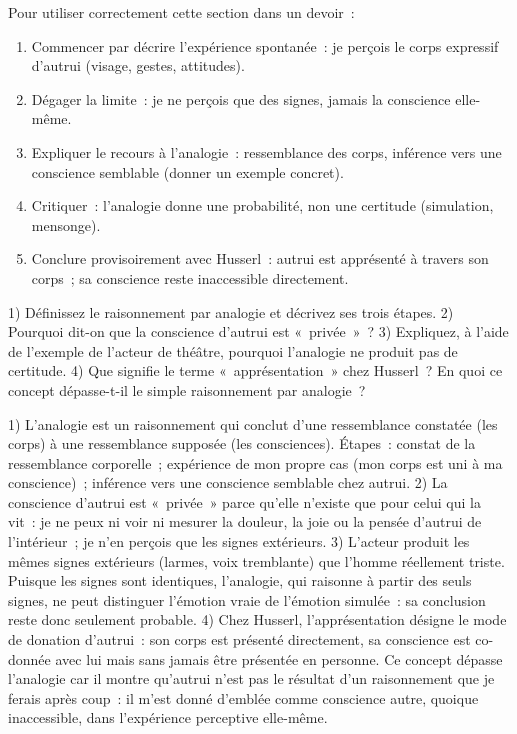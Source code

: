 \documentclass[11pt]{article}
\begin{document}
\begin{methode}
Pour utiliser correctement cette section dans un devoir~:
\begin{enumerate}
\item Commencer par décrire l'expérience spontanée~: je perçois le corps expressif d'autrui (visage, gestes, attitudes).
\item Dégager la limite~: je ne perçois que des signes, jamais la conscience elle-même.
\item Expliquer le recours à l'analogie~: ressemblance des corps, inférence vers une conscience semblable (donner un exemple concret).
\item Critiquer~: l'analogie donne une probabilité, non une certitude (simulation, mensonge).
\item Conclure provisoirement avec Husserl~: autrui est apprésenté à travers son corps~; sa conscience reste inaccessible directement.
\end{enumerate}
\end{methode}

\begin{exercice}[Entraînement]
1) Définissez le raisonnement par analogie et décrivez ses trois étapes. 2) Pourquoi dit-on que la conscience d'autrui est «~privée~»~? 3) Expliquez, à l'aide de l'exemple de l'acteur de théâtre, pourquoi l'analogie ne produit pas de certitude. 4) Que signifie le terme «~apprésentation~» chez Husserl~? En quoi ce concept dépasse-t-il le simple raisonnement par analogie~?
\end{exercice}

\begin{corrige}[Exercice]
1) L'analogie est un raisonnement qui conclut d'une ressemblance constatée (les corps) à une ressemblance supposée (les consciences). Étapes~: constat de la ressemblance corporelle~; expérience de mon propre cas (mon corps est uni à ma conscience)~; inférence vers une conscience semblable chez autrui. 2) La conscience d'autrui est «~privée~» parce qu'elle n'existe que pour celui qui la vit~: je ne peux ni voir ni mesurer la douleur, la joie ou la pensée d'autrui de l'intérieur~; je n'en perçois que les signes extérieurs. 3) L'acteur produit les mêmes signes extérieurs (larmes, voix tremblante) que l'homme réellement triste. Puisque les signes sont identiques, l'analogie, qui raisonne à partir des seuls signes, ne peut distinguer l'émotion vraie de l'émotion simulée~: sa conclusion reste donc seulement probable. 4) Chez Husserl, l'apprésentation désigne le mode de donation d'autrui~: son corps est présenté directement, sa conscience est co-donnée avec lui mais sans jamais être présentée en personne. Ce concept dépasse l'analogie car il montre qu'autrui n'est pas le résultat d'un raisonnement que je ferais après coup~: il m'est donné d'emblée comme conscience autre, quoique inaccessible, dans l'expérience perceptive elle-même.
\end{corrige}
\end{document}
